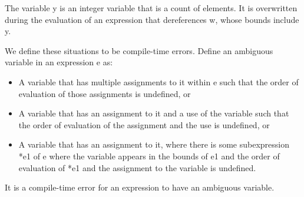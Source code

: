 The variable y is an integer variable that is a count of elements. It is
overwritten during the evaluation of an expression that dereferences w,
whose bounds include y.

We define these situations to be compile-time errors. Define an
ambiguous variable in an expression e as:

\begin{itemize}
\item
  A variable that has multiple assignments to it within e such that the
  order of evaluation of those assignments is undefined, or
\item
  A variable that has an assignment to it and a use of the variable such
  that the order of evaluation of the assignment and the use is
  undefined, or
\item
  A variable that has an assignment to it, where there is some
  subexpression *e1 of e where the variable appears in the bounds of e1
  and the order of evaluation of *e1 and the assignment to the variable
  is undefined.
\end{itemize}
It is a compile-time error for an expression to have an ambiguous
variable.
